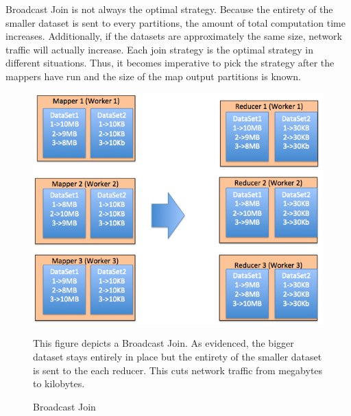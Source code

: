 Broadcast Join is not always the optimal strategy. Because the entirety of the smaller dataset is sent to every partitions, the amount of total computation time increases. Additionally, if the datasets are approximately the same size, network traffic will actually increase. 
Each join strategy is the optimal strategy in different situations. Thus, it becomes imperative
to pick the strategy after the mappers have run and the size of the map output partitions is known.

 \begin{figure}[h]
\begin{center}
\includegraphics[scale=0.6]{./img/broadcast_join.png}
\caption{Broadcast Join}
\label{fig:broadcast_join}
\end{center}
This figure depicts a Broadcast Join. As evidenced, the bigger dataset stays entirely in place but the entirety 
of the smaller dataset is sent to the each reducer. This cuts network traffic from megabytes to kilobytes.
\end{figure}


